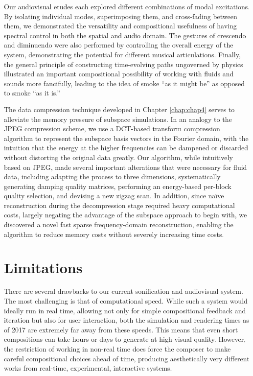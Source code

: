 Our audiovisual etudes each explored different combinations of modal excitations. By isolating individual modes, superimposing them, and cross-fading between them, we demonstrated
the versatility and compositional usefulness of having spectral control in both the spatial and audio domain. The gestures of crescendo and diminuendo were also performed by controlling the
overall energy of the system, demonstrating the potential for different musical articulations. Finally, the general principle of constructing time-evolving paths ungoverned by physics illustrated
an important compositional possibility of working with fluids and sounds more fancifully, leading to the idea of smoke ``as it might be'' as opposed to smoke ``as it is.'' 

The data compression technique developed in Chapter \ref{chap:chap4} serves to alleviate the memory pressure of subspace simulations. In an analogy to the JPEG compression scheme,
we use a DCT-based transform compression algorithm to represent the subspace basis vectors in the Fourier domain, with the intuition that the energy at the higher frequencies can be 
dampened or discarded without distorting the original data greatly. Our algorithm, while intuitively based on JPEG, made several important alterations that were necessary for fluid data, including
adapting the process to three dimensions, systematically generating damping quality matrices, performing an energy-based per-block quality selection, and devising a new zigzag scan. In addition, 
since na\"ive reconstruction during the decompression stage required heavy computational costs, largely negating the advantage of the subspace approach to begin with, we discovered a novel 
fast sparse frequency-domain reconstruction, enabling the algorithm to reduce memory costs without severely increasing time costs.

\section{Limitations}
There are several drawbacks to our current sonification and audiovisual system. The most challenging is that of computational speed. While such a system would ideally run in real time,
allowing not only for simple compositional feedback and iteration but also for user interaction, both the simulation and rendering times as of 2017 are extremely far away from these speeds.
This means that even short compositions can take hours or days to generate at high visual quality. However, the restriction of working in non-real time does force the composer to make careful
compositional choices ahead of time, producing aesthetically very different works from real-time, experimental, interactive systems. 

